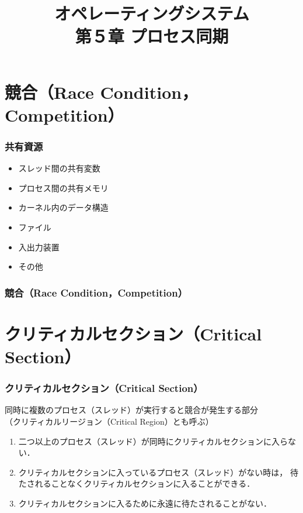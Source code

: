 \documentclass{beamer}                   %
\begin{document}
\title[OS]{オペレーティングシステム\\第５章 プロセス同期}
\date{}

\begin{frame}
  \titlepage
\end{frame}


\section{競合（Race Condition，Competition）}
\begin{frame}
  \frametitle{共有資源}
  \begin{itemize}
    \item スレッド間の共有変数
    \item プロセス間の共有メモリ
    \item カーネル内のデータ構造
    \item ファイル
    \item 入出力装置
    \item その他
  \end{itemize}
\end{frame}

\begin{frame}
  \frametitle{競合（Race Condition，Competition）}
  
\end{frame}

\section{クリティカルセクション（Critical Section）}
\begin{frame}
  \frametitle{クリティカルセクション（Critical Section）}
  同時に複数のプロセス（スレッド）が実行すると競合が発生する部分\\
  （クリティカルリージョン（Critical Region）とも呼ぶ）
  \begin{enumerate}
  \item 二つ以上のプロセス（スレッド）が同時にクリティカルセクションに入らない．
  \item クリティカルセクションに入っているプロセス（スレッド）がない時は，
    待たされることなくクリティカルセクションに入ることができる．
  \item クリティカルセクションに入るために永遠に待たされることがない．
  \end{enumerate}
\end{frame}
\end{document}
